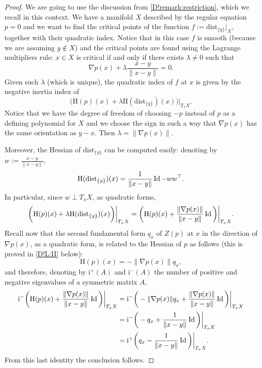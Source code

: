 \begin{proof}
  We are going to use the discussion from \cref{D!remark:restriction}, which we recall in this context. We have a manifold $X$ described by the regular equation $p=0$ and we want to find the critical points of the function $f:=\mathrm{dist}_{\{y\}}|_X$, together with their quadratic index. Notice that in this case $f$ is smooth (because we are assuming $y\notin X$) and the critical points are found using the Lagrange multipliers rule: $x\in X$ is critical if and only if there exists $\lambda\neq 0$ such that
  \[
    \nabla p(x)+\lambda \frac{x-y}{\|x-y\|}=0.
  \]
  Given such $\lambda$ (which is unique), the quadratic index of $f$ at $x$ is given by the negative inertia index of 
  \[
    \bigg(\mathrm{H}(p)(x)+\lambda \mathrm{H}(\mathrm{dist}_{\{y\}})(x)\bigg)\bigg|_{T_xX}.
  \]
  Notice that we have the degree of freedom of choosing $-p$ instead of $p$ as a defining polynomial for $X$ and we choose the sign in such a way that $\nabla p(x)$ has the same orientation as $y-x$. Then $\lambda=\|\nabla p(x)\|$.

  Moreover, the Hessian of $\mathrm{dist}_{\{y\}}$ can be computed easily: denoting by $w:=\tfrac{x-y}{\|x-y\|}$,
  \[
    \mathrm{H}(\mathrm{dist}_{\{y\}})(x)=\frac{1}{\|x-y\|}\operatorname{Id}-w w^\top.
  \]
  In particular, since $w\perp T_xX$, as quadratic forms,
  \[
    \bigg(\mathrm{H}(p)(x)+\lambda \mathrm{H}(\mathrm{dist}_{\{y\}})(x)\bigg)\bigg|_{T_xX}=\bigg(\mathrm{H}(p)(x)+\frac{\|\nabla p(x)\|}{\|x-y\|}\operatorname{Id} \bigg)\bigg|_{T_xX}.
  \]
  Recall now that the second fundamental form $q_x$ of $Z(p)$ at $x$ in the direction of $\nabla p(x)$, as a quadratic form, is related to the Hessian of $p$ as follows (this is proved in \cref{D!L:II} below):
  \[
    \mathrm{H}(p)(x)=-\|\nabla p(x)\|q_x,
  \]
  and therefore, denoting by $\mathrm{i}^+(A)$ and $\mathrm{i}^-(A)$ the number of positive and negative eigenvalues of a symmetric matrix $A$,
  \begin{align*}
    \mathrm{i}^{-}\bigg(\mathrm{H}(p)(x)+\frac{\|\nabla p(x)\|}{\|x-y\|}\operatorname{Id} \bigg)\bigg|_{T_xX}&=\mathrm{i}^{-}\bigg(-\|\nabla p(x)\|q_x+\frac{\|\nabla p(x)\|}{\|x-y\|}\operatorname{Id} \bigg)\bigg|_{T_xX}\\
    &=\mathrm{i}^{-}\bigg(-q_x+\frac{1}{\|x-y\|}\operatorname{Id} \bigg)\bigg|_{T_xX}\\
    &=\mathrm{i}^{+}\bigg(q_x-\frac{1}{\|x-y\|}\operatorname{Id} \bigg)\bigg|_{T_xX}.
  \end{align*}
  From this last identity the conclusion follows.
\end{proof}

